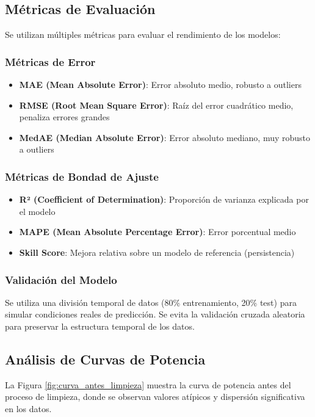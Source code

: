 \documentclass[conference]{IEEEtran}
\begin{document}
	\subsection{Métricas de Evaluación}
	Se utilizan múltiples métricas para evaluar el rendimiento de los modelos:
	
	\subsubsection{Métricas de Error}
	\begin{itemize}
		\item \textbf{MAE (Mean Absolute Error)}: Error absoluto medio, robusto a outliers
		\item \textbf{RMSE (Root Mean Square Error)}: Raíz del error cuadrático medio, penaliza errores grandes
		\item \textbf{MedAE (Median Absolute Error)}: Error absoluto mediano, muy robusto a outliers
	\end{itemize}
	
	\subsubsection{Métricas de Bondad de Ajuste}
	\begin{itemize}
		\item \textbf{R² (Coefficient of Determination)}: Proporción de varianza explicada por el modelo
		\item \textbf{MAPE (Mean Absolute Percentage Error)}: Error porcentual medio
		\item \textbf{Skill Score}: Mejora relativa sobre un modelo de referencia (persistencia)
	\end{itemize}
	
	\subsubsection{Validación del Modelo}
	Se utiliza una división temporal de datos (80\% entrenamiento, 20\% test) para simular condiciones reales de predicción. Se evita la validación cruzada aleatoria para preservar la estructura temporal de los datos.
	
	\subsection{Análisis de Curvas de Potencia}
	La Figura \ref{fig:curva_antes_limpieza} muestra la curva de potencia antes del proceso de limpieza, donde se observan valores atípicos y dispersión significativa en los datos.
	
\end{document}

